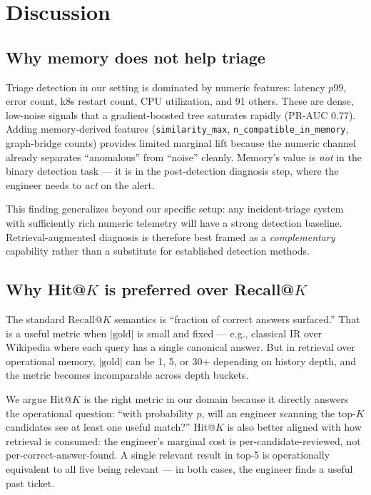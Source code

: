 \section{Discussion}
\label{sec:discussion}

\subsection{Why memory does not help triage}

Triage detection in our setting is dominated by numeric features: latency $p99$, error count, k8s restart count, CPU utilization, and 91 others. These are dense, low-noise signals that a gradient-boosted tree saturates rapidly (PR-AUC 0.77). Adding memory-derived features (\texttt{similarity\_max}, \texttt{n\_compatible\_in\_memory}, graph-bridge counts) provides limited marginal lift because the numeric channel already separates ``anomalous'' from ``noise'' cleanly. Memory's value is \emph{not} in the binary detection task --- it is in the post-detection diagnosis step, where the engineer needs to \emph{act} on the alert.

This finding generalizes beyond our specific setup: any incident-triage system with sufficiently rich numeric telemetry will have a strong detection baseline. Retrieval-augmented diagnosis is therefore best framed as a \emph{complementary} capability rather than a substitute for established detection methods.

\subsection{Why Hit@$K$ is preferred over Recall@$K$}

The standard $\text{Recall@}K$ semantics is ``fraction of correct answers surfaced.'' That is a useful metric when $|\text{gold}|$ is small and fixed --- e.g., classical IR over Wikipedia where each query has a single canonical answer. But in retrieval over operational memory, $|\text{gold}|$ can be 1, 5, or 30+ depending on history depth, and the metric becomes incomparable across depth buckets.

We argue Hit@$K$ is the right metric in our domain because it directly answers the operational question: ``with probability $p$, will an engineer scanning the top-$K$ candidates see at least one useful match?'' Hit@$K$ is also better aligned with how retrieval is consumed: the engineer's marginal cost is per-candidate-reviewed, not per-correct-answer-found. A single relevant result in top-5 is operationally equivalent to all five being relevant --- in both cases, the engineer finds a useful past ticket.

